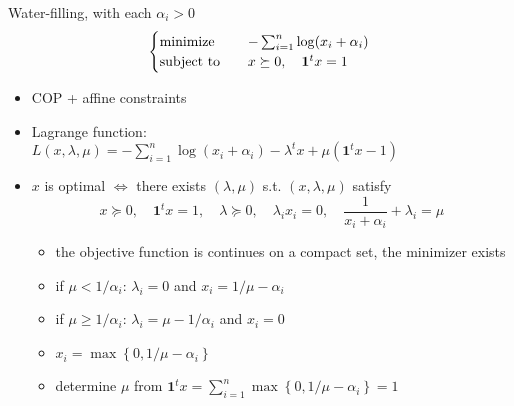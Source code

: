 \begin{remark}
    Water-filling, with each $\alpha_i > 0$\[\begin{cases}
        \operatorname{minimize} \quad &-\sum_{i = 1}^n \log(x_i + \alpha_i)\\
        \operatorname{subject\ to}\quad &x \succeq 0, \quad \mathbf{1}^tx = 1
    \end{cases}\]
    \begin{itemize}
        \item COP + affine constraints
        \item Lagrange function: $L(x, \lambda, \mu) = -\sum_{i = 1}^n\log(x_i + \alpha_i) - \lambda^tx + \mu(\mathbf{1}^tx - 1)$
        \item $x$ is optimal $\Longleftrightarrow$ there exists $(\lambda, \mu)$ s.t. $(x, \lambda, \mu)$ satisfy\[x \succeq 0, \quad \mathbf{1}^tx = 1, \quad \lambda \succeq 0, \quad \lambda_ix_i = 0, \quad \frac{1}{x_i + \alpha_i} + \lambda_i = \mu\]\begin{itemize}
            \item the objective function is continues on a compact set, the minimizer exists
            \item if $\mu < 1 / \alpha_i$: $\lambda_i = 0$ and $x_i = 1 / \mu - \alpha_i$
            \item if $\mu \ge 1 / \alpha_i$: $\lambda_i = \mu - 1 / \alpha_i$ and $x_i = 0$
            \item $x_i = \max\left\{0, 1 / \mu - \alpha_i\right\}$
            \item determine $\mu$ from $\mathbf{1}^tx = \sum_{i = 1}^n\max\left\{0, 1 / \mu - \alpha_i\right\} = 1$
        \end{itemize}
    \end{itemize}
\end{remark}

